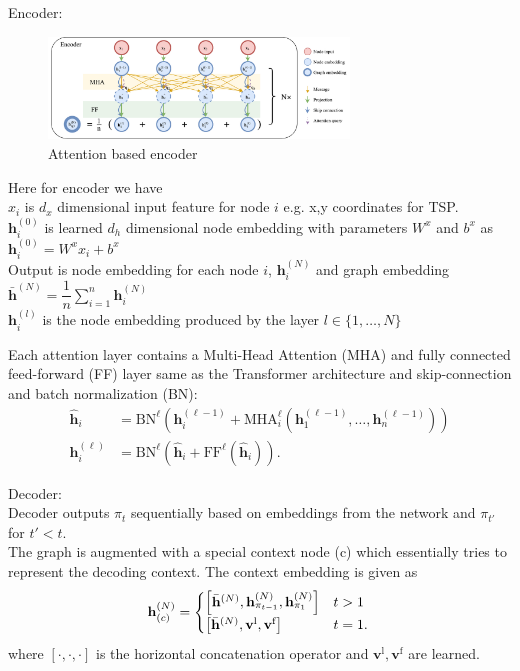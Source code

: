 \documentclass{article}
\theoremstyle{definition}
\begin{document}
Encoder:
\begin{figure}[H]
    \centering
    \includegraphics[width=8cm]{images/Encoder.pdf}
    \caption{Attention based encoder}
    \label{fig:my_label}
\end{figure}
Here for encoder we have\\
$x_i$ is $d_x$ dimensional input feature for node $i$ e.g. x,y coordinates for TSP.\\
$ \mathbf{h}_i^{(0)}$ is learned $d_h$ dimensional node embedding with parameters $W^x$ and $b^x$ as $ \mathbf{h}_i^{(0)}=W^xx_i+b^x$\\
Output is node embedding for each node $i$, $ \mathbf{h}_i^{(N)}$ and graph embedding $\bar{\mathbf{h}} ^{(N)}=\dfrac{1}{n}\sum_{i=1}^n  \mathbf{h}_i^{(N)}$\\
$ \mathbf{h}_i^{(l)}$ is the node embedding produced by the layer $l\in\{1,\ldots,N\}$

Each attention layer contains a Multi-Head Attention (MHA) and fully connected feed-forward (FF) layer same as the Transformer architecture and  skip-connection and batch normalization (BN):
\begin{align}
	 \hat{\mathbf{h}}_i & =\text{BN}^{\ell}\left( \mathbf{h}_i^{(\ell-1)} + \text{MHA}_i^{\ell}\left( \mathbf{h}_1^{(\ell-1)}, \ldots, \mathbf{h}_n^{(\ell-1)}\right)\right) \label{eq:attn_sublayer1} \\
    \mathbf{h}_i^{(\ell)} & =\text{BN}^{\ell}\left(\hat{\mathbf{h}}_i + \text{FF}^{\ell}(\hat{\mathbf{h}}_i)\right). \label{eq:attn_sublayer2}
\end{align}





Decoder:\\
Decoder outputs $\pi_t$ sequentially based on embeddings from the network and $\pi_{t'}$ for $t'<t$.\\

The graph is augmented with a special context node (c) which essentially tries to represent the decoding context. The context embedding is given as 
\begin{equation}
	\mathbf{h}_{(c)}^{(N)} = \begin{cases}
		\left[\bar{\mathbf{h}}^{(N)} , \mathbf{h}^{(N)}_{\pi_{t-1}} , \mathbf{h}^{(N)}_{\pi_1}\right] & t > 1 \\
        \left[\bar{\mathbf{h}}^{(N)} , \mathbf{v}^\text{l} , \mathbf{v}^\text{f}\right] & t = 1.
\end{cases} \\
\end{equation}
where $[\cdot,\cdot,\cdot]$ is the horizontal concatenation operator and $\mathbf{v}^\text{l} , \mathbf{v}^\text{f}$ are learned.\\
\end{document}
